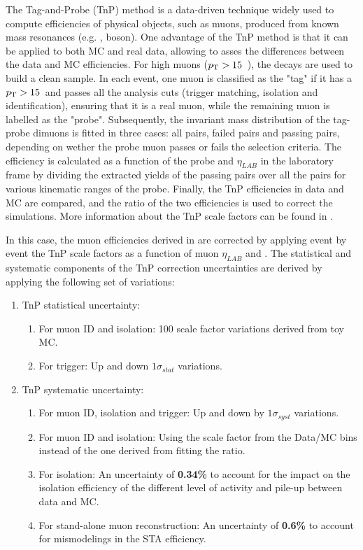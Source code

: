 The Tag-and-Probe (TnP) method is a data-driven technique widely used to compute efficiencies of physical objects, such as muons, produced from known mass resonances (e.g. \JPsi, \Z boson). One advantage of the TnP method is that it can be applied to both MC and real data, allowing to asses the differences between the data and MC efficiencies. For high \pt muons ($p_{\mathrm{T}} > 15$~\GeVc), the \ZToMuMu decays are used to build a clean sample. In each event, one muon is classified as the "tag" if it has a $p_{\mathrm{T}} > 15$~\GeVc and passes all the analysis cuts (trigger matching, isolation and identification), ensuring that it is a real muon, while the remaining muon is labelled as the "probe". Subsequently, the invariant mass distribution of the tag-probe dimuons is fitted in three cases: all pairs, failed pairs and passing pairs, depending on wether the probe muon passes or fails the selection criteria. The efficiency is calculated as a function of the probe \pt and $\eta_{LAB}$ in the laboratory frame by dividing the extracted yields of the passing pairs over all the pairs for various kinematic ranges of the probe. Finally, the TnP efficiencies in data and MC are compared, and the ratio of the two efficiencies is used to correct the simulations. More information about the \pPb TnP scale factors can be found in \cite{Muon_TnP_pPb}.

In this case, the muon efficiencies derived in  are corrected by applying event by event the TnP scale factors as a function of muon $\eta_{LAB}$ and \pt. The statistical and systematic components of the TnP correction uncertainties are derived by applying the following set of variations:

\begin{enumerate}
   \item TnP statistical uncertainty:
   \begin{enumerate}
      \item For muon ID and isolation: 100 scale factor variations derived from toy MC.
      \item For trigger: Up and down $1 \sigma_{stat}$ variations.
   \end{enumerate}
   \item TnP systematic uncertainty:
   \begin{enumerate}
      \item For muon ID, isolation and trigger: Up and down by $1 \sigma_{syst}$ variations.
      \item For muon ID and isolation: Using the scale factor from the Data/MC bins instead of the one derived from fitting the ratio.
      \item For isolation: An uncertainty of {\bf 0.34\%} to account for the impact on the isolation efficiency of the different level of activity and pile-up between data and MC.
      \item For stand-alone muon reconstruction: An uncertainty of {\bf 0.6\%} to account for mismodelings in the STA efficiency.
   \end{enumerate}
\end{enumerate}

